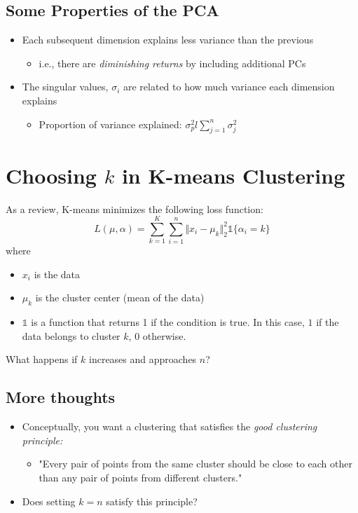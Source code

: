 \documentclass[10pt]{article}
\begin{document}
\subsection*{Some Properties of the PCA}
\begin{itemize}
    \item Each subsequent dimension explains less variance than the previous
    \begin{itemize}
        \item i.e., there are \textit{diminishing returns} by including additional PCs
    \end{itemize}
    \item The singular values, $\sigma_i$ are related to how much variance each dimension explains
    \begin{itemize}
        \item Proportion of variance explained: $\sigma_p^2 l \sum_{j = 1}^n \sigma_j^2$
    \end{itemize}
\end{itemize}
\pagebreak
\section*{Choosing $k$ in K-means Clustering}
As a review, K-means minimizes the following loss function:
\[L(\mu, \alpha) = \sum_{k = 1}^K \sum_{i = 1}^n \Vert x_i - \mu_k \Vert_2^2 \mathds{1}\{\alpha_i = k\}\]
where
\begin{itemize}
    \item $x_i$ is the data
    \item $\mu_k$ is the cluster center (mean of the data)
    \item $\mathds{1}$ is a function that returns 1 if the condition is true.  In this case, $1$ if the data belongs to cluster $k$, $0$ otherwise.
\end{itemize}
What happens if $k$ increases and approaches $n$?

\subsection*{More thoughts}
\begin{itemize}
    \item Conceptually, you want a clustering that satisfies the \textit{good clustering principle:}
    \begin{itemize}
        \item "Every pair of points from the same cluster should be close to each other than any pair of points from different clusters."
    \end{itemize}
    \item Does setting $k = n$ satisfy this principle?
\end{itemize}
\end{document}
